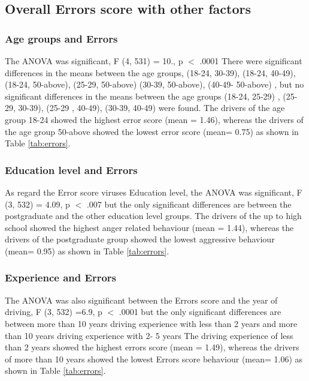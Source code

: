 \documentclass[preprint,12pt,a4paper,authoryear]{elsarticle}
\begin{document}
\begin{linenumbers}
\subsection{Overall Errors score with other factors}

\subsubsection{Age groups and Errors}

The ANOVA was significant, F (4, 531) = 10., p $<$ .0001 There were significant differences in the means between the age groups, (18-24, 30-39), (18-24, 40-49),  (18-24, 50-above), (25-29, 50-above) (30-39, 50-above), (40-49- 50-above)  , but no significant differences in the means between the age groups (18-24, 25-29) , (25-29, 30-39), (25-29 , 40-49), (30-39, 40-49) were found. The drivers of the age group 18-24 showed the highest error score (mean = 1.46), whereas the drivers of the age group 50-above showed the lowest error score (mean= 0.75) as shown in Table \ref{tab:errors}.

\subsubsection{Education level and Errors}

As regard the Error score viruses Education level, the ANOVA was significant, F (3, 532) = 4.09, p $<$ .007 but the only significant differences are between the postgraduate and the other education level groups. The drivers of the up to high school showed the highest anger related behaviour (mean = 1.44), whereas the drivers of the postgraduate group showed the lowest aggressive behaviour (mean= 0.95) as shown in Table \ref{tab:errors}.

\subsubsection{Experience and Errors}

The ANOVA was also significant between the Errors score and the year of driving, F (3, 532) =6.9, p $<$ .0001 but the only significant differences are between more than 10 years driving experience with less than 2 years and   more than 10 years driving experience with 2- 5 years The driving experience of less than 2 years showed the highest errors score (mean = 1.49), whereas the drivers of more than 10 years showed the lowest Errors score behaviour (mean= 1.06) as shown in Table \ref{tab:errors}.


\end{linenumbers}
\end{document}
